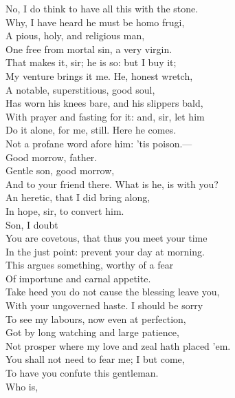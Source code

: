 \documentclass[a4paper,oneside,12pt]{memoir}
\begin{document}
\begin{drama*}
\mammonspeaks No, I do think to have all this with the stone.\\
\surlyspeaks Why, I have heard he must be homo frugi,\\
A pious, holy, and religious man,\\
One free from mortal sin, a very virgin.\\
\mammonspeaks That makes it, sir; he is so: but I buy it;\\
My venture brings it me. He, honest wretch,\\
A notable, superstitious, good soul,\\
Has worn his knees bare, and his slippers bald,\\
With prayer and fasting for it: and, sir, let him\\
Do it alone, for me, still. Here he comes.\\
Not a profane word afore him: 'tis poison.---\\
Good morrow, father.\\
\subtlespeaks {} Gentle son, good morrow,\\
And to your friend there. What is he, is with you?\\
\mammonspeaks An heretic, that I did bring along,\\
In hope, sir, to convert him.\\
\subtlespeaks {} Son, I doubt\\
You are covetous, that thus you meet your time\\
In the just point: prevent your day at morning.\\
This argues something, worthy of a fear\\
Of importune and carnal appetite.\\
Take heed you do not cause the blessing leave you,\\
With your ungoverned haste. I should be sorry\\
To see my labours, now even at perfection,\\
Got by long watching and large patience,\\
Not prosper where my love and zeal hath placed 'em.\\
\mammonspeaks You shall not need to fear me; I but come,\\
To have you confute this gentleman.\\
\surlyspeaks {} Who is,\\

\end{drama*}
\end{document}
